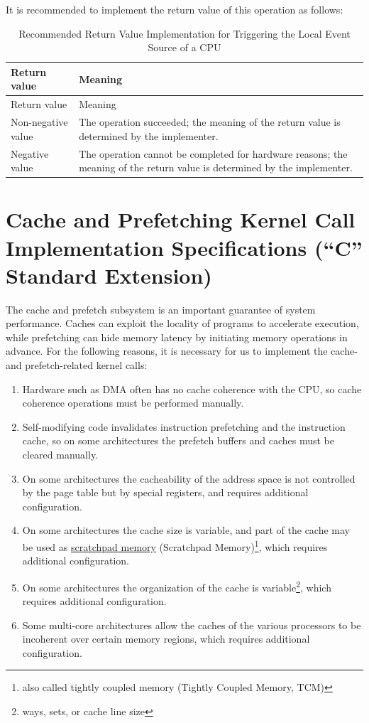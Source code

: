 It is recommended to implement the return value of this operation as follows:

\begin{xltabular}{\textwidth}{@{}>{\hsize\raggedright\arraybackslash}X>{\hsize\raggedright\arraybackslash}X@{}}
\caption{Recommended Return Value Implementation for Triggering the Local Event Source of a CPU}\label{tab:8-23-trigger-local-event-source-suggested-return-values}\\
\toprule
Return value & Meaning\tabularnewline
\endfirsthead
\toprule
Return value & Meaning\tabularnewline
\midrule
\endhead
\bottomrule
\endlastfoot
    Non-negative value & The operation succeeded; the meaning of the return value is determined by the implementer.\tabularnewline
    Negative value & The operation cannot be completed for hardware reasons; the meaning of the return value is determined by the implementer.\tabularnewline
\end{xltabular}
\nopagebreak[4]

\section{Cache and Prefetching Kernel Call Implementation Specifications (``C'' Standard Extension)}\label{sec:8-cache-and-prefetch-kernel-calls}

The cache and prefetch subsystem is an important guarantee of system performance. Caches can exploit the locality of programs to accelerate execution, while prefetching can hide memory latency by initiating memory operations in advance. For the following reasons, it is necessary for us to implement the cache- and prefetch-related kernel calls:

\begin{enumerate}
\def\labelenumi{\arabic{enumi}.}
\item
  Hardware such as DMA often has no cache coherence with the CPU, so cache coherence operations must be performed manually.
\item
  Self-modifying code invalidates instruction prefetching and the instruction cache, so on some architectures the prefetch buffers and caches must be cleared manually.
\item
  On some architectures the cacheability of the address space is not controlled by the page table but by special registers, and requires additional configuration.
\item
  On some architectures the cache size is variable, and part of the cache may be used as \href{https://blog.csdn.net/dark5669/article/details/56013548}{scratchpad memory} (Scratchpad
  Memory)\footnote{also called tightly coupled memory (Tightly Coupled Memory, TCM)}, which requires additional configuration.
\item
  On some architectures the organization of the cache is variable\footnote{ways, sets, or cache line size}, which requires additional configuration.
\item
  Some multi-core architectures allow the caches of the various processors to be incoherent over certain memory regions, which requires additional configuration.
\end{enumerate}

